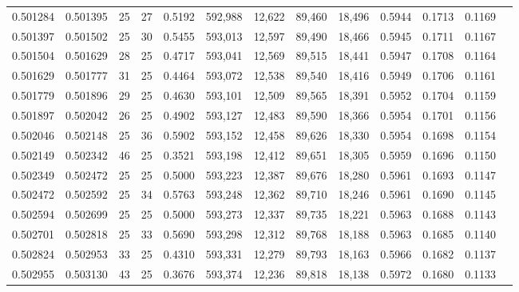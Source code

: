 \begin{tabular}{rrrrrrrrrrrrr}
0.501284 & 0.501395 &    25 &  27 &                                     0.5192 & 592,988 &  12,622 &  89,460 &  18,496 & 0.5944 & 0.1713 & 0.1169 \\
0.501397 & 0.501502 &    25 &  30 &                                     0.5455 & 593,013 &  12,597 &  89,490 &  18,466 & 0.5945 & 0.1711 & 0.1167 \\
0.501504 & 0.501629 &    28 &  25 &                                     0.4717 & 593,041 &  12,569 &  89,515 &  18,441 & 0.5947 & 0.1708 & 0.1164 \\
0.501629 & 0.501777 &    31 &  25 &                                     0.4464 & 593,072 &  12,538 &  89,540 &  18,416 & 0.5949 & 0.1706 & 0.1161 \\
0.501779 & 0.501896 &    29 &  25 &                                     0.4630 & 593,101 &  12,509 &  89,565 &  18,391 & 0.5952 & 0.1704 & 0.1159 \\
0.501897 & 0.502042 &    26 &  25 &                                     0.4902 & 593,127 &  12,483 &  89,590 &  18,366 & 0.5954 & 0.1701 & 0.1156 \\
0.502046 & 0.502148 &    25 &  36 &                                     0.5902 & 593,152 &  12,458 &  89,626 &  18,330 & 0.5954 & 0.1698 & 0.1154 \\
0.502149 & 0.502342 &    46 &  25 &                                     0.3521 & 593,198 &  12,412 &  89,651 &  18,305 & 0.5959 & 0.1696 & 0.1150 \\
0.502349 & 0.502472 &    25 &  25 &                                     0.5000 & 593,223 &  12,387 &  89,676 &  18,280 & 0.5961 & 0.1693 & 0.1147 \\
0.502472 & 0.502592 &    25 &  34 &                                     0.5763 & 593,248 &  12,362 &  89,710 &  18,246 & 0.5961 & 0.1690 & 0.1145 \\
0.502594 & 0.502699 &    25 &  25 &                                     0.5000 & 593,273 &  12,337 &  89,735 &  18,221 & 0.5963 & 0.1688 & 0.1143 \\
0.502701 & 0.502818 &    25 &  33 &                                     0.5690 & 593,298 &  12,312 &  89,768 &  18,188 & 0.5963 & 0.1685 & 0.1140 \\
0.502824 & 0.502953 &    33 &  25 &                                     0.4310 & 593,331 &  12,279 &  89,793 &  18,163 & 0.5966 & 0.1682 & 0.1137 \\
0.502955 & 0.503130 &    43 &  25 &                                     0.3676 & 593,374 &  12,236 &  89,818 &  18,138 & 0.5972 & 0.1680 & 0.1133 \\

\end{tabular}
